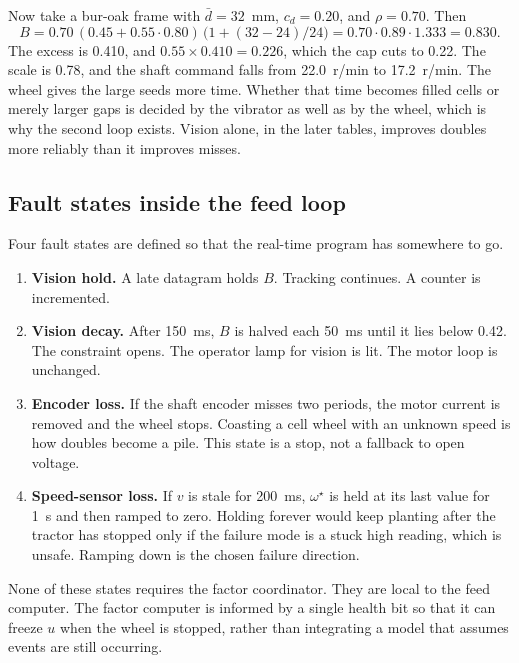 Now take a bur-oak frame with $\bar d=32$~mm, $c_d=0.20$, and $\rho=0.70$. Then
\begin{equation}
B = 0.70\,(0.45+0.55\cdot 0.80)\,\big(1+(32-24)/24\big) = 0.70\cdot 0.89\cdot 1.333 = 0.830.
\end{equation}
The excess is 0.410, and $0.55\times 0.410=0.226$, which the cap cuts to 0.22. The scale is 0.78, and the shaft command falls from 22.0~r/min to 17.2~r/min. The wheel gives the large seeds more time. Whether that time becomes filled cells or merely larger gaps is decided by the vibrator as well as by the wheel, which is why the second loop exists. Vision alone, in the later tables, improves doubles more reliably than it improves misses.

\subsection{Fault states inside the feed loop}

Four fault states are defined so that the real-time program has somewhere to go.

\begin{enumerate}
\item \textbf{Vision hold.} A late datagram holds $B$. Tracking continues. A counter is incremented.
\item \textbf{Vision decay.} After 150~ms, $B$ is halved each 50~ms until it lies below 0.42. The constraint opens. The operator lamp for vision is lit. The motor loop is unchanged.
\item \textbf{Encoder loss.} If the shaft encoder misses two periods, the motor current is removed and the wheel stops. Coasting a cell wheel with an unknown speed is how doubles become a pile. This state is a stop, not a fallback to open voltage.
\item \textbf{Speed-sensor loss.} If $v$ is stale for 200~ms, $\omega^{\star}$ is held at its last value for 1~s and then ramped to zero. Holding forever would keep planting after the tractor has stopped only if the failure mode is a stuck high reading, which is unsafe. Ramping down is the chosen failure direction.
\end{enumerate}

None of these states requires the factor coordinator. They are local to the feed computer. The factor computer is informed by a single health bit so that it can freeze $u$ when the wheel is stopped, rather than integrating a model that assumes events are still occurring.

